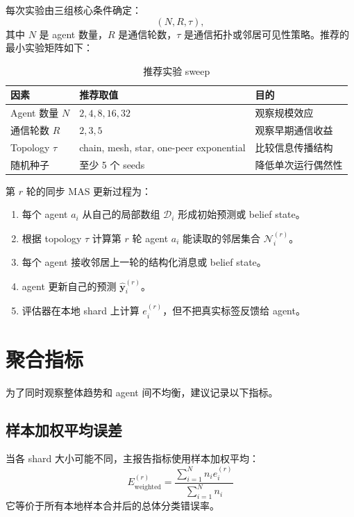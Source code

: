 \documentclass[UTF8,11pt,a4paper,fontset=fandol]{ctexart}
\begin{document}
每次实验由三组核心条件确定：
\[
(N,R,\tau),
\]
其中 \(N\) 是 agent 数量，\(R\) 是通信轮数，\(\tau\) 是通信拓扑或邻居可见性策略。推荐的最小实验矩阵如下：

\begin{table}[h]
\centering
\caption{推荐实验 sweep}
\begin{tabular}{lll}
\toprule
因素 & 推荐取值 & 目的 \\
\midrule
Agent 数量 \(N\) & \(2,4,8,16,32\) & 观察规模效应 \\
通信轮数 \(R\) & \(2,3,5\) & 观察早期通信收益 \\
Topology \(\tau\) & chain, mesh, star, one-peer exponential & 比较信息传播结构 \\
随机种子 & 至少 5 个 seeds & 降低单次运行偶然性 \\
\bottomrule
\end{tabular}
\end{table}

第 \(r\) 轮的同步 MAS 更新过程为：

\begin{enumerate}
  \item 每个 agent \(a_i\) 从自己的局部数组 \(\mathcal{D}_i\) 形成初始预测或 belief state。
  \item 根据 topology \(\tau\) 计算第 \(r\) 轮 agent \(a_i\) 能读取的邻居集合 \(\mathcal{N}_i^{(r)}\)。
  \item 每个 agent 接收邻居上一轮的结构化消息或 belief state。
  \item agent 更新自己的预测 \(\hat{\mathbf{y}}_i^{(r)}\)。
  \item 评估器在本地 shard 上计算 \(e_i^{(r)}\)，但不把真实标签反馈给 agent。
\end{enumerate}

\section{聚合指标}

为了同时观察整体趋势和 agent 间不均衡，建议记录以下指标。

\subsection{样本加权平均误差}

当各 shard 大小可能不同，主报告指标使用样本加权平均：
\[
\boxed{
E_{\mathrm{weighted}}^{(r)}
=
\frac{\sum_{i=1}^{N} n_i e_i^{(r)}}{\sum_{i=1}^{N}n_i}
}
\]
它等价于所有本地样本合并后的总体分类错误率。
\end{document}
